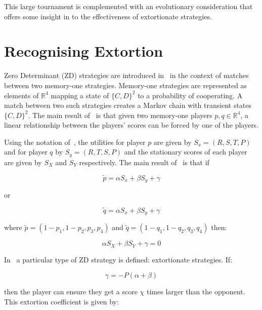 \documentclass[a4paper]{article}
\begin{document}
This large tournament is complemented with an evolutionary consideration that
offers some insight in to the effectiveness of extortionate strategies.

\section{Recognising Extortion}\label{sec:kappa-zd-strategies}

Zero Determinant (ZD) strategies are introduced in~\cite{Press2012} in the
context of matches between two memory-one strategies.  Memory-one strategies are
represented as elements of \(\mathbb{R}^4\) mapping a state of \({\{C, D\}}^2\)
to a probability of cooperating.  A match between two such strategies creates a
Markov chain with transient states \({\{C, D\}}^2\).  The main result
of~\cite{Press2012} is that given two memory-one players \(p,
q\in\mathbb{R}^4\), a linear relationship between the players' scores can be
forced by one of the players.

Using the notation of~\cite{Press2012}, the utilities for player \(p\)
are given by \(S_x=(R, S, T, P)\) and for player \(q\) by \(S_y=(R, T, S, P)\)
and the stationary scores of each player are given by \(S_X\) and \(S_Y\)
respectively. The main result of~\cite{Press2012} is that if

\begin{equation}\label{eqn:linear_relationship_for_p}
    \tilde p=\alpha S_x + \beta S_y + \gamma
\end{equation}

or

\begin{equation}\label{eqn:linear_relationship_for_q}
    \tilde q=\alpha S_x + \beta S_y + \gamma
\end{equation}

where \(\tilde p = (1 - p_1, 1 - p_2, p_3, p_4)\) and
\(\tilde q = (1 - q_1, 1 - q_2, q_3, q_4)\) then:

\begin{equation}
    \alpha S_X + \beta S_Y + \gamma = 0
\end{equation}

In~\cite{Press2012} a particular type of ZD strategy is defined: extortionate
strategies. If:

\begin{equation}\label{eqn:constraint_for_extortion}
    \gamma = - P(\alpha + \beta)
\end{equation}

then the player can ensure they get a score \(\chi\) times
larger than the opponent. This extortion coefficient is given by:
\end{document}
